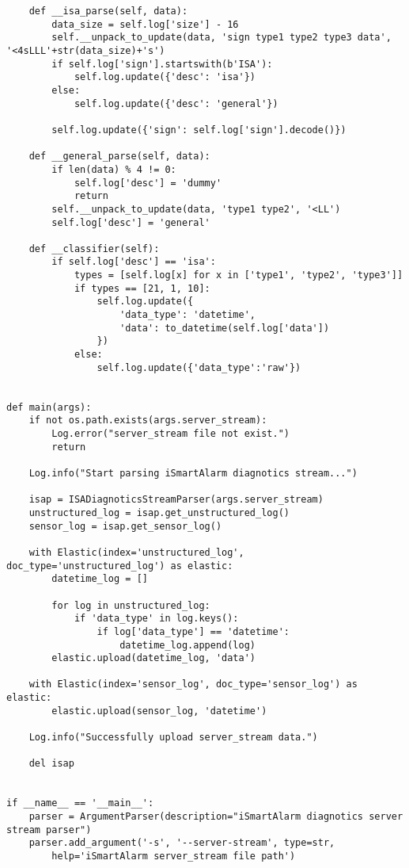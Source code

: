 \documentclass{easychair}
\begin{document}
\begin{enumerate}
\begin{lstlisting}
    def __isa_parse(self, data):
        data_size = self.log['size'] - 16
        self.__unpack_to_update(data, 'sign type1 type2 type3 data', '<4sLLL'+str(data_size)+'s')
        if self.log['sign'].startswith(b'ISA'):
            self.log.update({'desc': 'isa'})
        else:
            self.log.update({'desc': 'general'})

        self.log.update({'sign': self.log['sign'].decode()})

    def __general_parse(self, data):
        if len(data) % 4 != 0:
            self.log['desc'] = 'dummy'
            return
        self.__unpack_to_update(data, 'type1 type2', '<LL')
        self.log['desc'] = 'general'

    def __classifier(self):
        if self.log['desc'] == 'isa':
            types = [self.log[x] for x in ['type1', 'type2', 'type3']]
            if types == [21, 1, 10]:
                self.log.update({
                    'data_type': 'datetime',
                    'data': to_datetime(self.log['data'])
                })
            else:
                self.log.update({'data_type':'raw'})


def main(args):
    if not os.path.exists(args.server_stream):
        Log.error("server_stream file not exist.")
        return

    Log.info("Start parsing iSmartAlarm diagnotics stream...")

    isap = ISADiagnoticsStreamParser(args.server_stream)
    unstructured_log = isap.get_unstructured_log()
    sensor_log = isap.get_sensor_log()

    with Elastic(index='unstructured_log', doc_type='unstructured_log') as elastic:
        datetime_log = []

        for log in unstructured_log:
            if 'data_type' in log.keys():
                if log['data_type'] == 'datetime':
                    datetime_log.append(log)
        elastic.upload(datetime_log, 'data')

    with Elastic(index='sensor_log', doc_type='sensor_log') as elastic:
        elastic.upload(sensor_log, 'datetime')

    Log.info("Successfully upload server_stream data.")

    del isap


if __name__ == '__main__':
    parser = ArgumentParser(description="iSmartAlarm diagnotics server stream parser")
    parser.add_argument('-s', '--server-stream', type=str,
        help='iSmartAlarm server_stream file path')


\end{lstlisting}
\end{enumerate}
\end{document}

